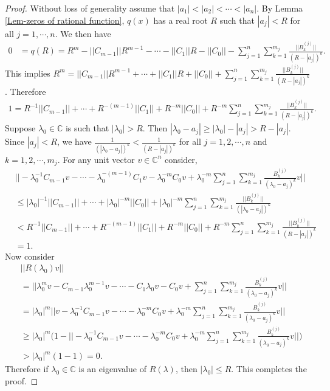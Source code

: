 \documentclass[12pt, reqno]{amsart}
\theoremstyle{definition}
\theoremstyle{remark}
\numberwithin{equation}{section}
\begin{document}
\begin{proof}
Without loss of generality assume that $|a_1| < |a_2| < \cdots < |a_n|$. By Lemma 
\ref{Lem-zeros of rational function}, $q(x)$ has a real root $R$ such that $|a_j| < R$ 
for all $j=1,\cdots,n$. We 
then have 
\begin{align*}
0 & = q(R)=R^m - ||C_{m-1}|| R^{m-1} - \cdots - ||C_1|| R -||C_0||-\displaystyle 
\sum_{j=1}^{n} \sum_{k=1}^{m_j} \frac{||B_k^{(j)}||}{(R- |a_j|)^k}.
\end{align*} 
This implies $R^m  = ||C_{m-1}|| R^{m-1} + \cdots + ||C_1|| R + ||C_0||+\displaystyle 
\sum_{j=1}^{n} \sum_{k=1}^{m_j} \frac{||B_k^{(j)}||}{(R- |a_j|)^k}$. Therefore
\begin{align*}
1 = R^{-1}||C_{m-1}||  + \cdots + R^{-(m-1)} ||C_1|| + R^{-m} ||C_0||
+\displaystyle R^{-m} \sum_{j=1}^{n} \sum_{k=1}^{m_j} \frac{||B_k^{(j)}||}{(R- |a_j|)^k}.
\end{align*}
Suppose $\lambda_0 \in \mathbb{C}$ is such that $|\lambda_0| > R$. Then 
$|\lambda_0-a_j|\geq |\lambda_0|-|a_j|>R-|a_j|$. Since $|a_j| < R$, we have 
$\displaystyle \frac{1}{(|\lambda_0-a_j|)^k} < \frac{1}{(R-|a_j|)^k}$ for all 
$j=1,2,\cdots,n$ and $k=1,2,\cdots,m_j$. For any unit vector $v \in \mathbb{C}^n$ 
consider, 
\begin{align*}
& \Big|\Big| - \lambda_0^{-1}C_{m-1}v - \cdots - \lambda_0^{-(m-1)} C_1 v - 
\lambda_0^{-m} C_0 v+ \displaystyle \lambda_0^{-m} \sum_{j=1}^{n} \sum_{k=1}^{m_j} 
\frac{B_k^{(j)}}{(\lambda_0-a_j)^k} v \Big|\Big|\\
& \leq |\lambda_0|^{-1} ||C_{m-1}|| + \cdots + 
|\lambda_0|^{-m} ||C_0|| + \displaystyle |\lambda_0|^{-m} \sum_{j=1}^{n} \sum_{k=1}^{m_j} 
\frac{||B_k^{(j)}||}{(|\lambda_0-a_j|)^k} \\
& < R^{-1} ||C_{m-1}|| + \cdots + R^{-(m-1)} ||C_1|| + R^{-m} ||C_0|| + \displaystyle 
R^{-m} \sum_{j=1}^{n} \sum_{k=1}^{m_j} \frac{||B_k^{(j)}||}{(R-|a_j|)^k} \\
& =1.
\end{align*}
Now consider 
\begin{align*}
& ||R(\lambda_0)v|| \\
& =\Big|\Big| \lambda_0^m v- C_{m-1}\lambda_0^{m-1}v - \cdots -C_1 \lambda_0 v - 
C_0 v+ \displaystyle \sum_{j=1}^{n} \sum_{k=1}^{m_j} 
\frac{B_k^{(j)}}{(\lambda_0-a_j)^k} v\Big|\Big| \\
& = |\lambda_0|^m\Big|\Big|v- \lambda_0^{-1}C_{m-1}v - \cdots - 
\lambda_0^{-m} C_0 v+ \displaystyle \lambda_0^{-m} 
\sum_{j=1}^{n} \sum_{k=1}^{m_j} \frac{B_k^{(j)}}{(\lambda_0-a_j)^k} v \Big|\Big| \\
& \geq |\lambda_0|^m\Big(1-\Big|\Big| - \lambda_0^{-1}C_{m-1}v - \cdots - 
\lambda_0^{-m} C_0 v+ \displaystyle \lambda_0^{-m} 
\sum_{j=1}^{n} \sum_{k=1}^{m_j} \frac{B_k^{(j)}}{(\lambda_0-a_j)^k} v \Big|\Big| 
\Big)\\
& > |\lambda_0|^m(1-1) = 0.
\end{align*}
Therefore if $\lambda_0\in \mathbb{C}$ is an eigenvalue of $R(\lambda)$, then 
$|\lambda_0| \leq R$. This completes the proof.
\end{proof}
\end{document}
